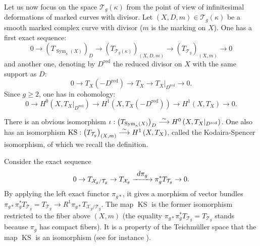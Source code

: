 \documentclass[JEP,XML,SOM,Unicode,NoEqCountersInSection,published]{cedram}
\newcommand\To[1]{\mathchoice{\xrightarrow{\textstyle\kern4pt#1\kern3pt}}{\stackrel{#1}{\longrightarrow}}{}{}}
\newcommand{\red}{\mathrm{red}}
\DeclareMathOperator{\KS}{KS}
\DeclareMathOperator{\Sym}{Sym}
\theoremstyle{definition}
\theoremstyle{plain}
\begin{document}
Let us now focus on the space $\mathcal T_g(\kappa)$ from the point of view of infinitesimal deformations of marked curves with divisor.
Let $(X, D, m) \in \mathcal T_g(\kappa)$ be a smooth marked complex curve with divisor ($m$ is the marking on $X$).
One has a first exact sequence:
\begin{equation}\label{eq_exact_tan_teich}
0 \to \left(T_{\Sym_{\kappa}(X)}\right)_D \to \left(T_{\mathcal T_g(\kappa)}\right)_{(X, D, m)} \to \left(T_{\mathcal T_g}\right)_{(X, m)} \to 0
\end{equation}
and another one, denoting by $D^{\red}$ the reduced divisor on $X$ with the same support as $D$:
\begin{equation*}
0 \to T_X\left(-D^{\red}\right) \to T_X \to T_X|_{D^{\red}} \to 0.
\end{equation*}
Since $g \ge 2$, one has in cohomology:
\begin{equation*}
0 \to H^0\left(X, T_X|_{D^{\red}}\right) \to H^1\left(X, T_X\left(-D^{\red}\right)\right) \to H^1\left(X, T_X\right) \to 0.
\end{equation*}

There is an obvious isomorphism $\iota: \left(T_{\Sym_{\kappa}(X)}\right)_D \To{\sim} H^0\left(X, T_X|_{D^{\red}}\right)$.
One also has an isomorphism $\KS: \left(T_{\mathcal T_g}\right)_{(X, m)} \To{\sim} H^1\left(X, T_X\right)$, called the Kodaira-Spencer isomorphism, of which we recall the definition.

Consider the exact sequence\vspace*{-3pt}
\begin{equation}\label{eq_kodaira_spencer_exact_sequence}
0 \to T_{\mathcal X_g/\mathcal T_g} \to T_{\mathcal X_g} \To{d\pi_g} \pi_g^*T_{\mathcal T_g} \to 0.
\end{equation}
By applying the left exact functor $\pi_{g*}$, it gives a morphism of vector bundles $\pi_{g*}\pi_g^*T_{\mathcal T_g} = T_{\mathcal T_g} \to R^1\pi_{g*}T_{\mathcal X_g/\mathcal T_g}$.
The map $\KS$ is the former isomorphism restricted to the fiber above $(X, m)$ (the equality $\pi_{g*}\pi_g^* T_{\mathcal T_g} = T_{\mathcal T_g}$ stands because $\pi_g$ has compact fibers).
It is a property of the Teichmüller space that the map $\KS$ is an isomorphism (see for instance \cite{earle-eells}).
\end{document}
